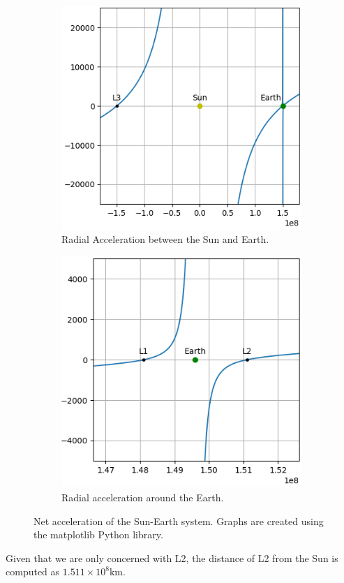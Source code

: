 \begin{figure}[H]
	\centering
	\captionsetup[subfigure]{justification=centering}
	\begin{subfigure}[b]{0.4\textwidth}
		\centering
		\includegraphics[scale=0.6]{r-accel-figure-1.png}
		\caption{\footnotesize Radial Acceleration between the Sun and Earth.}
		\label{fig:radial-accel-system}
	\end{subfigure}
	\hspace*{1cm}
	\begin{subfigure}[b]{0.4\textwidth}
		\centering
		\includegraphics[scale=0.6]{r-accel-figure-2.png}
		\caption{\footnotesize Radial acceleration around the Earth.\vspace*{1.16em}}
		\label{fig:radial-accel-earth}
	\end{subfigure}
	\label{fig:radial-accel}
	\caption{Net acceleration of the Sun-Earth system. Graphs are created using the matplotlib Python library.}
\end{figure}
Given that we are only concerned with L2, the distance of L2 from the Sun is computed as $1.511 \times 10^8 \si{\kilo\metre}$.

